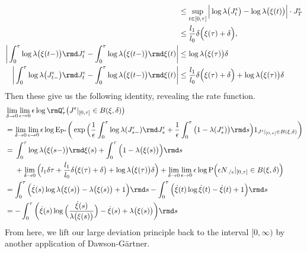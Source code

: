 \begin{example}
\begin{align*}
    &\leq \sup_{t\in[0,\tau]} \Big| \log\affInt\big(J^\epsilon_t\big) - \log\affInt\big(\pathVar(t)\big) \Big| \cdot J^\epsilon_T \\
    &\leq \frac{\affIntPart_1}{\affIntPart_0} \delta \Big( \pathVar(\tau) + \delta \Big), \\
    \bigg| \int_0^\tau \log\affInt\big(\pathVar(t-)\big) \rmd J^\epsilon_t - \int_0^\tau \log\affInt\big(\pathVar(t-)\big) \rmd \pathVar(t)  \bigg| 
    &\leq \log\affInt\big(\pathVar(\tau)\big) \delta \\
    \bigg| \int_0^\tau \log\affInt\big(J^\epsilon_{t-}\big) \rmd J^\epsilon_t - \int_0^\tau \log\affInt\big(\pathVar(t-)\big) \rmd \pathVar(t) \bigg| 
    &\leq \frac{\affIntPart_1}{\affIntPart_0} \delta \Big( \pathVar(\tau) + \delta \Big) + \log\affInt\big(\pathVar(\tau)\big) \delta 
  \end{align*}
  Then these give us the following identity, revealing the rate function.
  \begin{align*}
    &\lim_{\delta\rightarrow0}\lim_{\epsilon\rightarrow0}\epsilon\log\mgPrb^\epsilon_\tau\big( J^\epsilon|_{[0,\tau]} \in \ball{\pathVar}{\delta} \big) \\
    &= \lim_{\delta\rightarrow0}\lim_{\epsilon\rightarrow0} \epsilon\log\Exp_{\Prb^\epsilon}\bigg( \exp\Big(\frac1\epsilon\int_0^\tau \log\affInt(J^\epsilon_{s-}) \rmd J^\epsilon_s + \frac1\epsilon\int_0^\tau \big(1 - \affInt(J^\epsilon_s) \big) \rmd s  \Big) 1_{J^\epsilon|_{[0,\tau]} \in \ball{\pathVar}{\delta}} \bigg) \\
    &= \begin{aligned}[t]
      & \int_0^\tau \log\affInt\big(\pathVar(s-)\big) \rmd\pathVar(s) + \int_0^\tau \Big(1 - \affInt\big(\pathVar(s)\big) \Big) \rmd s \\
      &+\lim_{\delta\rightarrow0} \Big( \affIntPart_1 \delta \tau + \frac{\affIntPart_1}{\affIntPart_0} \delta \big( \pathVar(\tau) + \delta \big) + \log\affInt\big(\pathVar(\tau)\big) \delta \Big) 
      +\lim_{\delta\rightarrow0}\lim_{\epsilon\rightarrow0} \epsilon \log \Prb\Big( \epsilon \N_{\cdot/\epsilon}|_{[0,\tau]} \in \ball{\pathVar}{\delta} \Big)
    \end{aligned} \\
    &= \int_0^\tau \Big( \dot\pathVar(s) \log \affInt\big(\pathVar(s)\big) - \affInt\big(\pathVar(s)\big) + 1 \Big) \rmd s - \int_0^\tau \Big(\dot\pathVar(t) \log \dot\pathVar(t) - \dot\pathVar(t) + 1 \Big) \rmd s \\
    &= -\int_0^\tau \bigg( \dot\pathVar(s) \log\Big(\frac{\dot\pathVar(s)}{\affInt\big(\pathVar(s)\big)} \Big) - \dot\pathVar(s) + \affInt\big(\pathVar(s)\big) \bigg) \rmd s
  \end{align*}
  From here, we lift our large deviation principle back to the interval $[0,\infty)$ by another application of Dawson-G\"artner.


\end{example}
